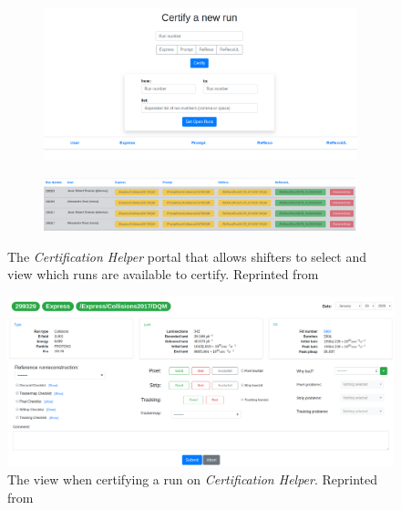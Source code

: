 \begin{figure}
	\centering

	\begin{subfigure}{.7\linewidth}
		\includegraphics*[width=\linewidth,trim= 4in 1.5in 4in 0]{Images/certhelper-portal.png}
	\end{subfigure}

	\begin{subfigure}{\linewidth}
		\includegraphics[width=1\linewidth]{Images/certhelper-list.png}
	\end{subfigure}
	\caption[The \textit{Certification Helper} portal]{The \textit{Certification Helper} portal that allows shifters to select and view which runs are available to certify. Reprinted from \cite{CertHelper}}
	\label{fig:certhelper-portal}
\end{figure}
\begin{figure}
	\centering
	\includegraphics[width=1\linewidth]{Images/certhelp-cert.png}
	\caption[The view when certifying a run on \textit{Certification Helper}]{The view when certifying a run on \textit{Certification Helper}. Reprinted from \cite{CertHelper}}
	\label{fig:certhelper-cert}
\end{figure}


